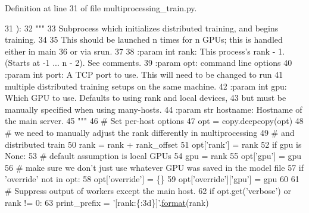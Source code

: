 Definition at line 31 of file multiprocessing\+\_\+train.\+py.


\begin{DoxyCode}
31 ):
32     \textcolor{stringliteral}{"""}
33 \textcolor{stringliteral}{    Subprocess which initializes distributed training, and begins training.}
34 \textcolor{stringliteral}{}
35 \textcolor{stringliteral}{    This should be launched n times for n GPUs; this is handled either in main}
36 \textcolor{stringliteral}{    or via srun.}
37 \textcolor{stringliteral}{}
38 \textcolor{stringliteral}{    :param int rank: This process's rank - 1. (Starts at -1 ... n - 2). See comments.}
39 \textcolor{stringliteral}{    :param opt: command line options}
40 \textcolor{stringliteral}{    :param int port: A TCP port to use. This will need to be changed to run}
41 \textcolor{stringliteral}{        multiple distributed training setups on the same machine.}
42 \textcolor{stringliteral}{    :param int gpu: Which GPU to use. Defaults to using rank and local devices,}
43 \textcolor{stringliteral}{        but must be manually specified when using many-hosts.}
44 \textcolor{stringliteral}{    :param str hostname: Hostname of the main server.}
45 \textcolor{stringliteral}{    """}
46     \textcolor{comment}{# Set per-host options}
47     opt = copy.deepcopy(opt)
48     \textcolor{comment}{# we need to manually adjust the rank differently in multiprocessing}
49     \textcolor{comment}{# and distributed train}
50     rank = rank + rank\_offset
51     opt[\textcolor{stringliteral}{'rank'}] = rank
52     \textcolor{keywordflow}{if} gpu \textcolor{keywordflow}{is} \textcolor{keywordtype}{None}:
53         \textcolor{comment}{# default assumption is local GPUs}
54         gpu = rank %
55     opt[\textcolor{stringliteral}{'gpu'}] = gpu
56     \textcolor{comment}{# make sure we don't just use whatever GPU was saved in the model file}
57     \textcolor{keywordflow}{if} \textcolor{stringliteral}{'override'} \textcolor{keywordflow}{not} \textcolor{keywordflow}{in} opt:
58         opt[\textcolor{stringliteral}{'override'}] = \{\}
59     opt[\textcolor{stringliteral}{'override'}][\textcolor{stringliteral}{'gpu'}] = gpu
60 
61     \textcolor{comment}{# Suppress output of workers except the main host.}
62     \textcolor{keywordflow}{if} opt.get(\textcolor{stringliteral}{'verbose'}) \textcolor{keywordflow}{or} rank != 0:
63         print\_prefix = \textcolor{stringliteral}{'[rank:\{:3d\}]'}.\hyperlink{namespaceparlai_1_1chat__service_1_1services_1_1messenger_1_1shared__utils_a32e2e2022b824fbaf80c747160b52a76}{format}(rank)

\end{DoxyCode}
